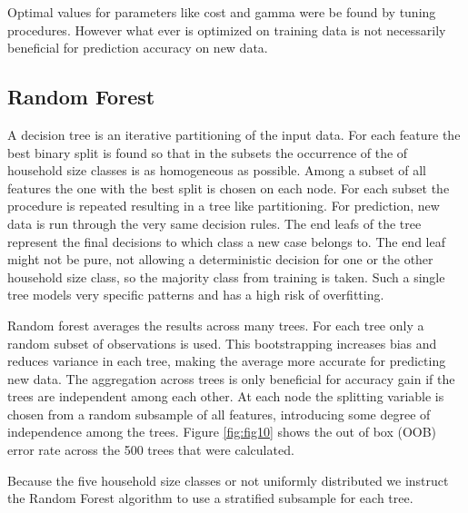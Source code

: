 \documentclass[]{article}
\newenvironment{Shaded}{\begin{snugshade}}{\end{snugshade}}
\newcommand{\DataTypeTok}[1]{\textcolor[rgb]{0.13,0.29,0.53}{#1}}
\newcommand{\DecValTok}[1]{\textcolor[rgb]{0.00,0.00,0.81}{#1}}
\newcommand{\FloatTok}[1]{\textcolor[rgb]{0.00,0.00,0.81}{#1}}
\newcommand{\KeywordTok}[1]{\textcolor[rgb]{0.13,0.29,0.53}{\textbf{#1}}}
\newcommand{\NormalTok}[1]{#1}
\newcommand{\OperatorTok}[1]{\textcolor[rgb]{0.81,0.36,0.00}{\textbf{#1}}}
\newcommand{\OtherTok}[1]{\textcolor[rgb]{0.56,0.35,0.01}{#1}}
\newcommand{\StringTok}[1]{\textcolor[rgb]{0.31,0.60,0.02}{#1}}
\begin{document}
Optimal values for parameters like cost and gamma were be found by
tuning procedures. However what ever is optimized on training data is
not necessarily beneficial for prediction accuracy on new data.

\hypertarget{random-forest}{%
\subsection{Random Forest}\label{random-forest}}

A decision tree is an iterative partitioning of the input data. For each
feature the best binary split is found so that in the subsets the
occurrence of the of household size classes is as homogeneous as
possible. Among a subset of all features the one with the best split is
chosen on each node. For each subset the procedure is repeated resulting
in a tree like partitioning. For prediction, new data is run through the
very same decision rules. The end leafs of the tree represent the final
decisions to which class a new case belongs to. The end leaf might not
be pure, not allowing a deterministic decision for one or the other
household size class, so the majority class from training is taken. Such
a single tree models very specific patterns and has a high risk of
overfitting.

Random forest averages the results across many trees. For each tree only
a random subset of observations is used. This bootstrapping increases
bias and reduces variance in each tree, making the average more accurate
for predicting new data. The aggregation across trees is only beneficial
for accuracy gain if the trees are independent among each other. At each
node the splitting variable is chosen from a random subsample of all
features, introducing some degree of independence among the trees.
Figure \ref{fig:fig10} shows the out of box (OOB) error rate across the
500 trees that were calculated.

Because the five household size classes or not uniformly distributed we
instruct the Random Forest algorithm to use a stratified subsample for
each tree.

\begin{Shaded}
\end{Shaded}
\end{document}
